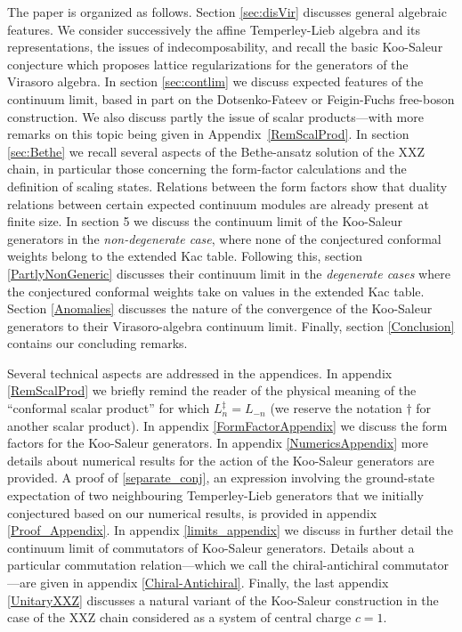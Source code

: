 \documentclass[a4paper,10pt]{article}
\newcommand{\linnea}[1]{$\framebox{\tiny L}$\ \textbf{\texttt{{\color{red}\footnotesize#1}}}}
\newcommand{\spindagger}{\dag}
\newcommand{\loopdagger}{\ddag}
\begin{document}
The paper is organized as follows. Section \ref{sec:disVir} discusses general algebraic features. We consider successively the affine Temperley-Lieb algebra and its representations, the issues of indecomposability, and recall the basic Koo-Saleur conjecture which proposes lattice regularizations for the generators of the Virasoro algebra. In section \ref{sec:contlim} we discuss expected features of the continuum limit, based in part on the Dotsenko-Fateev  or Feigin-Fuchs free-boson construction. We also discuss partly the issue of scalar products---with more remarks on this topic being given in Appendix~\ref{RemScalProd}. In section \ref{sec:Bethe} we recall several aspects of the Bethe-ansatz solution of the XXZ chain, in particular those concerning the form-factor calculations and the definition of scaling states. Relations between the form factors show that duality relations between certain expected continuum modules are already present at finite size. In section 5 we discuss the continuum limit of the Koo-Saleur generators in the {\sl non-degenerate case}, where none of the conjectured conformal weights belong to the extended Kac table. Following this, section \ref{PartlyNonGeneric} discusses their continuum limit in the {\sl degenerate cases} where the conjectured conformal weights take on values in the extended Kac table.  %
Section \ref{Anomalies} discusses the nature of the convergence of the Koo-Saleur generators to their Virasoro-algebra continuum limit. Finally, section \ref{Conclusion} contains our concluding remarks.


Several technical aspects are addressed in the appendices. In appendix \ref{RemScalProd} we briefly remind the reader of the physical meaning of the ``conformal scalar product'' for which $L_n^\loopdagger=L_{-n}$ (we reserve the notation $\spindagger$ for another scalar product). In  appendix \ref{FormFactorAppendix} we discuss the form factors for the Koo-Saleur generators. In appendix \ref{NumericsAppendix}  more details about  numerical results  for the action of the Koo-Saleur generators are provided. A proof of \eqref{separate_conj}, an expression involving the ground-state expectation of two neighbouring Temperley-Lieb generators that we initially conjectured based on our numerical results, is provided in appendix \ref{Proof_Appendix}.
In appendix \ref{limits_appendix} we discuss in further detail the continuum limit of commutators of Koo-Saleur generators. Details about a particular commutation relation---which we call the chiral-antichiral commutator---are given in appendix \ref{Chiral-Antichiral}. Finally, the last appendix \ref{UnitaryXXZ} discusses a natural variant of the Koo-Saleur construction in the case of the XXZ chain considered as a system of central charge $c=1$.
\end{document}

